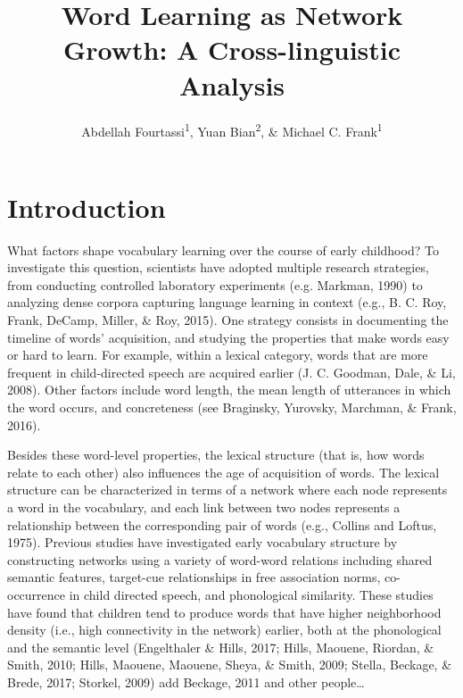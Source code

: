 \documentclass[english,floatsintext,man]{apa6}
\title{Word Learning as Network Growth: A Cross-linguistic Analysis}
\author{Abdellah Fourtassi\textsuperscript{1}, Yuan Bian\textsuperscript{2}, \& Michael C. Frank\textsuperscript{1}}
\affiliation{
    \vspace{0.5cm}
          \textsuperscript{1} Department of Psychology, Stanford University\\
          \textsuperscript{2} Department of Psychology, University of Illinois  }
\theoremstyle{definition}
\theoremstyle{definition}
\theoremstyle{definition}
\theoremstyle{remark}
\begin{document}
\maketitle

\setcounter{secnumdepth}{0}



\section{Introduction}\label{introduction}

What factors shape vocabulary learning over the course of early
childhood? To investigate this question, scientists have adopted
multiple research strategies, from conducting controlled laboratory
experiments (e.g. Markman, 1990) to analyzing dense corpora capturing
language learning in context (e.g., B. C. Roy, Frank, DeCamp, Miller, \&
Roy, 2015). One strategy consists in documenting the timeline of words'
acquisition, and studying the properties that make words easy or hard to
learn. For example, within a lexical category, words that are more
frequent in child-directed speech are acquired earlier (J. C. Goodman,
Dale, \& Li, 2008). Other factors include word length, the mean length
of utterances in which the word occurs, and concreteness (see Braginsky,
Yurovsky, Marchman, \& Frank, 2016).

Besides these word-level properties, the lexical structure (that is, how
words relate to each other) also influences the age of acquisition of
words. The lexical structure can be characterized in terms of a network
where each node represents a word in the vocabulary, and each link
between two nodes represents a relationship between the corresponding
pair of words (e.g., Collins and Loftus, 1975). Previous studies have
investigated early vocabulary structure by constructing networks using a
variety of word-word relations including shared semantic features,
target-cue relationships in free association norms, co-occurrence in
child directed speech, and phonological similarity. These studies have
found that children tend to produce words that have higher neighborhood
density (i.e., high connectivity in the network) earlier, both at the
phonological and the semantic level (Engelthaler \& Hills, 2017; Hills,
Maouene, Riordan, \& Smith, 2010; Hills, Maouene, Maouene, Sheya, \&
Smith, 2009; Stella, Beckage, \& Brede, 2017; Storkel, 2009) add
Beckage, 2011 and other people\ldots{}
\end{document}

